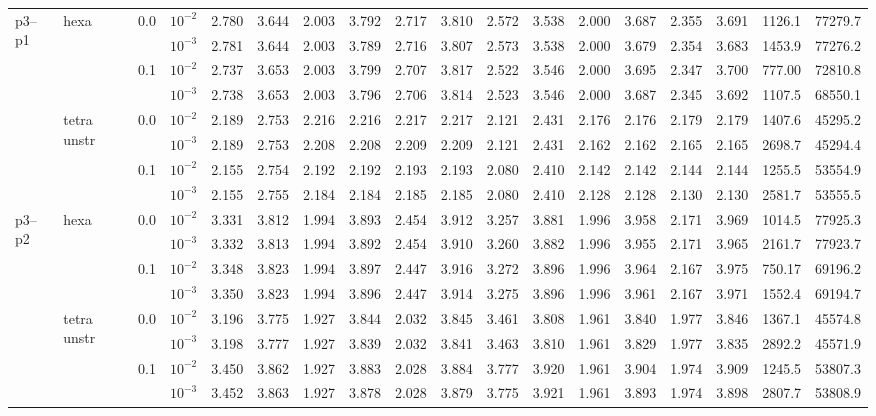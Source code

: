 \begin{longtable}{llclrrrrrrrrrrrrrr}
\multirow{8}{*}{p3--p1} & \multirow{4}{*}{hexa} & \multirow{2}{*}{0.0} & $10^{-2}$ & 2.780 & 3.644 & 2.003 & 3.792 & 2.717 & 3.810 & 2.572 & 3.538 & 2.000 & 3.687 & 2.355 & 3.691 & 1126.1 & 77279.7 \\
& & & $10^{-3}$ & 2.781 & 3.644 & 2.003 & 3.789 & 2.716 & 3.807 & 2.573 & 3.538 & 2.000 & 3.679 & 2.354 & 3.683 & 1453.9 & 77276.2 \\\cline{3-18}
& & \multirow{2}{*}{0.1} & $10^{-2}$ & 2.737 & 3.653 & 2.003 & 3.799 & 2.707 & 3.817 & 2.522 & 3.546 & 2.000 & 3.695 & 2.347 & 3.700 & 777.00 & 72810.8 \\
& & & $10^{-3}$ & 2.738 & 3.653 & 2.003 & 3.796 & 2.706 & 3.814 & 2.523 & 3.546 & 2.000 & 3.687 & 2.345 & 3.692 & 1107.5 & 68550.1 \\\cline{2-18}
& \multirow{4}{*}{tetra unstr} & \multirow{2}{*}{0.0} & $10^{-2}$ & 2.189 & 2.753 & 2.216 & 2.216 & 2.217 & 2.217 & 2.121 & 2.431 & 2.176 & 2.176 & 2.179 & 2.179 & 1407.6 & 45295.2 \\
& & & $10^{-3}$ & 2.189 & 2.753 & 2.208 & 2.208 & 2.209 & 2.209 & 2.121 & 2.431 & 2.162 & 2.162 & 2.165 & 2.165 & 2698.7 & 45294.4 \\\cline{3-18}
& & \multirow{2}{*}{0.1} & $10^{-2}$ & 2.155 & 2.754 & 2.192 & 2.192 & 2.193 & 2.193 & 2.080 & 2.410 & 2.142 & 2.142 & 2.144 & 2.144 & 1255.5 & 53554.9 \\
& & & $10^{-3}$ & 2.155 & 2.755 & 2.184 & 2.184 & 2.185 & 2.185 & 2.080 & 2.410 & 2.128 & 2.128 & 2.130 & 2.130 & 2581.7 & 53555.5 \\\hline

\multirow{8}{*}{p3--p2} & \multirow{4}{*}{hexa} & \multirow{2}{*}{0.0} & $10^{-2}$ & 3.331 & 3.812 & 1.994 & 3.893 & 2.454 & 3.912 & 3.257 & 3.881 & 1.996 & 3.958 & 2.171 & 3.969 & 1014.5 & 77925.3 \\
& & & $10^{-3}$ & 3.332 & 3.813 & 1.994 & 3.892 & 2.454 & 3.910 & 3.260 & 3.882 & 1.996 & 3.955 & 2.171 & 3.965 & 2161.7 & 77923.7 \\\cline{3-18}
& & \multirow{2}{*}{0.1} & $10^{-2}$ & 3.348 & 3.823 & 1.994 & 3.897 & 2.447 & 3.916 & 3.272 & 3.896 & 1.996 & 3.964 & 2.167 & 3.975 & 750.17 & 69196.2 \\
& & & $10^{-3}$ & 3.350 & 3.823 & 1.994 & 3.896 & 2.447 & 3.914 & 3.275 & 3.896 & 1.996 & 3.961 & 2.167 & 3.971 & 1552.4 & 69194.7 \\\cline{2-18}
& \multirow{4}{*}{tetra unstr} & \multirow{2}{*}{0.0} & $10^{-2}$ & 3.196 & 3.775 & 1.927 & 3.844 & 2.032 & 3.845 & 3.461 & 3.808 & 1.961 & 3.840 & 1.977 & 3.846 & 1367.1 & 45574.8 \\
& & & $10^{-3}$ & 3.198 & 3.777 & 1.927 & 3.839 & 2.032 & 3.841 & 3.463 & 3.810 & 1.961 & 3.829 & 1.977 & 3.835 & 2892.2 & 45571.9 \\\cline{3-18}
& & \multirow{2}{*}{0.1} & $10^{-2}$ & 3.450 & 3.862 & 1.927 & 3.883 & 2.028 & 3.884 & 3.777 & 3.920 & 1.961 & 3.904 & 1.974 & 3.909 & 1245.5 & 53807.3 \\
& & & $10^{-3}$ & 3.452 & 3.863 & 1.927 & 3.878 & 2.028 & 3.879 & 3.775 & 3.921 & 1.961 & 3.893 & 1.974 & 3.898 & 2807.7 & 53808.9 \\\hline


\end{longtable}
